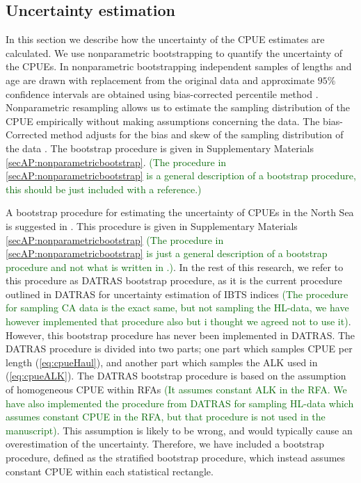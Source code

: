 \documentclass[a4paper 12pt]{article}
\numberwithin{equation}{section}
\newcommand{\olav}[1]{\textcolor{darkgreen}{#1}}
\begin{document}
\subsection{Uncertainty estimation}
\label{sec:uncertaintyestimation}
In this section we describe how the uncertainty of the CPUE estimates are calculated. We use nonparametric bootstrapping to quantify the uncertainty of the CPUEs. In nonparametric bootstrapping independent samples of lengths and age are drawn with replacement from the original data and approximate $95\%$ confidence intervals are obtained using bias-corrected percentile method  \citep{carpenter2000bootstrap}. Nonparametric resampling allows us to estimate the sampling distribution of the CPUE empirically without making assumptions concerning the data. The bias-Corrected method adjusts for the bias and skew of the sampling distribution of the data \citep{puth2015variety, karlsson2009bootstrap}. The bootstrap procedure is given in Supplementary Materials \ref{secAP:nonparametricbootstrap}.  \olav{(The procedure in \ref{secAP:nonparametricbootstrap} is a general description of a bootstrap procedure, this should  be just included with a reference.)}

A bootstrap procedure for estimating the uncertainty of CPUEs in the North Sea is suggested in \citet{ICES2006Report}. This procedure is given in Supplementary Materials \ref{secAP:nonparametricbootstrap} \olav{(The procedure in \ref{secAP:nonparametricbootstrap} is just a general description of a bootstrap procedure and not what is written in \citet{ICES2006Report}.)}. In the rest of this research, we refer to this procedure as DATRAS bootstrap procedure, as it is the current procedure outlined in DATRAS for uncertainty estimation of IBTS indices \olav{(The procedure for sampling CA data is the exact same, but not sampling the HL-data, we have however implemented that procedure also but i thought we agreed not to use it)}. However, this bootstrap procedure has never been implemented in DATRAS. The DATRAS procedure is divided into two parts; one part which samples CPUE per length (\ref{eq:cpueHaul}), and another part which samples the ALK used in (\ref{eq:cpueALK}). The DATRAS bootstrap procedure is based on the assumption of homogeneous CPUE within RFAs \olav{(It assumes constant ALK in the RFA. We have also implemented the procedure from DATRAS for sampling HL-data which assumes constant CPUE in the RFA, but that procedure is not used in the manuscript)}. This assumption is likely to be wrong, and would typically cause an overestimation of the uncertainty.  Therefore, we have included a bootstrap procedure, defined as the stratified bootstrap procedure, which instead assumes constant CPUE within each statistical rectangle. 
\end{document}
